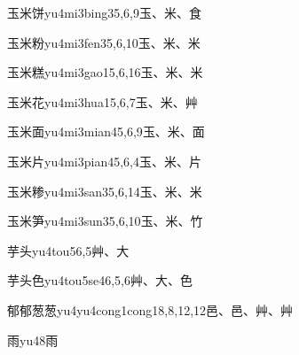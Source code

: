 \begin{entry}{玉米饼}{yu4mi3bing3}{5,6,9}{⽟、⽶、⾷}
\end{entry}

\begin{entry}{玉米粉}{yu4mi3fen3}{5,6,10}{⽟、⽶、⽶}
\end{entry}

\begin{entry}{玉米糕}{yu4mi3gao1}{5,6,16}{⽟、⽶、⽶}
\end{entry}

\begin{entry}{玉米花}{yu4mi3hua1}{5,6,7}{⽟、⽶、⾋}
\end{entry}

\begin{entry}{玉米面}{yu4mi3mian4}{5,6,9}{⽟、⽶、⾯}
\end{entry}

\begin{entry}{玉米片}{yu4mi3pian4}{5,6,4}{⽟、⽶、⽚}
\end{entry}

\begin{entry}{玉米糁}{yu4mi3san3}{5,6,14}{⽟、⽶、⽶}
\end{entry}

\begin{entry}{玉米笋}{yu4mi3sun3}{5,6,10}{⽟、⽶、⽵}
\end{entry}

\begin{entry}{芋头}{yu4tou5}{6,5}{⾋、⼤}
\end{entry}

\begin{entry}{芋头色}{yu4tou5se4}{6,5,6}{⾋、⼤、⾊}
\end{entry}

\begin{entry}{郁郁葱葱}{yu4yu4cong1cong1}{8,8,12,12}{⾢、⾢、⾋、⾋}
\end{entry}

\begin{entry}{雨}{yu4}{8}{⾬}
\end{entry}

